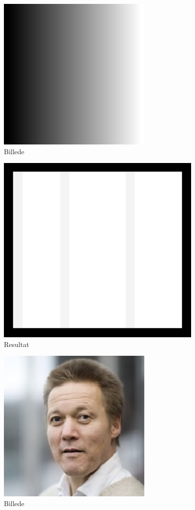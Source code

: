 \documentclass{article}
\begin{document}
	\begin{figure}
		\centering
		\includegraphics[width=3in]{test2.png}
		\caption{Billede}
		\label{ke2}
	\end{figure}
	\begin{figure}
		\centering
		\includegraphics[width=4in]{test2_result.png}
		\caption{Resultat}
		\label{ke2r}
	\end{figure}
	\begin{figure}
		\centering
		\includegraphics[width=3in]{test3.jpg}
		\caption{Billede}
		\label{ke3}
	\end{figure}
\end{document}
